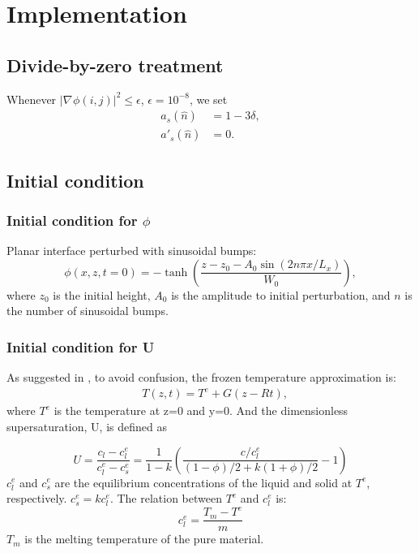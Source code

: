 \documentclass[a4paper,12pt]{article}
\newcommand{\grad}[1]{\nabla_{#1}}
\begin{document}
\section{Implementation}


\subsection{Divide-by-zero treatment}
Whenever $|\grad{}\phi(i,j)|^{2} \leq \epsilon $, $\epsilon = 10^{-8}$, we set \cite{Provatas2010}
\begin{align*}
a_s(\hat{n}) &= 1-3\delta, \\
a'_s(\hat{n}) &= 0.
\end{align*}

\subsection{Initial condition}
\subsubsection{Initial condition for $\phi$}
Planar interface perturbed with sinusoidal bumps:
\begin{equation}
\phi(x,z,t=0) = - \tanh \left( \frac{z - z_0 - A_0\sin(2n\pi x /L_x  ) }{W_0}  \right),
\end{equation}
where $z_0$ is the initial height, $A_0$ is the amplitude to initial perturbation, and $n$ is the number of  sinusoidal bumps.  
\subsubsection{Initial condition for U}
As suggested in \cite{Takaki2014}, to avoid confusion, the frozen temperature approximation is:
\begin{align}
    & T(z,t) = T^e + G(z-Rt),
\end{align}
where $T^e$ is the temperature at z=0 and y=0.
And the dimensionless supersaturation, U, is defined as

\begin{equation}
U=\frac{c_{l}-c_{l}^{e}}{c_{l}^{e}-c_{s}^{e}}=\frac{1}{1-k} \left( \frac{ c/c_l^e}{(1-\phi)/2 + k(1+\phi)/2} -1\right)
\end{equation}
$c_l^e$ and $c_s^e$ are the equilibrium concentrations of the liquid and solid at $T^e$, respectively. $c_s^e=kc_l^e$.
The relation between $T^e$ and $c_l^e$ is:
\begin{equation}
c_l^e = \frac{T_m-T^{e}}{m}
\end{equation}
$T_m$ is the melting temperature of the pure material.
\end{document}
